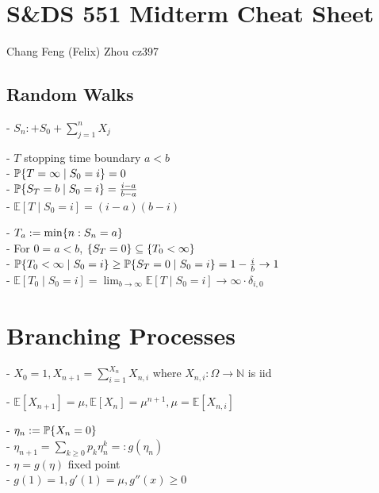 \documentclass[10pt]{article}
\DeclarePairedDelimiter{\set}{\lbrace}{\rbrace}
\newcommand{\E}{\mathbb{E}}
\newcommand{\N}{\mathbb{N}}
\renewcommand{\P}{\mathbb{P}}
\newcommand{\sset}{\subseteq}
\begin{document}
\iffalse
\begin{center}
    {\Large\textbf{Yale University}}\\
    \vspace{3mm}
    {\Large\textbf{S\&DS 551, Spring 2023}}\\
    \vspace{2mm}
    {\Large\textbf{Homework 3}}\\
    \vspace{3mm}
    \textbf{Chang Feng (Felix) Zhou cz397}
\end{center}
\fi

\begin{multicols}{3}
\section*{S\&DS 551 Midterm Cheat Sheet}
Chang Feng (Felix) Zhou
cz397

\subsection*{Random Walks}
- $S_n :+ S_0 + \sum_{j=1}^n X_j$

- $T$ stopping time boundary $a < b$ \\
- $\P\set{T=\infty\mid S_0=i} = 0$ \\
- $\P\set{S_T = b\mid S_0=i} = \frac{i-a}{b-a}$ \\
- $\E\left[ T\mid S_0=i \right] = (i-a)(b-i)$

- $T_a := \min\set{n: S_n=a}$ \\
- For $0=a<b$,
$\set{S_T=0}\sset \set{T_0<\infty}$ \\
- $\P\set{T_0<\infty\mid S_0=i}\geq \P\set{S_T=0\mid S_0=i} = 1-\frac{i}b\to 1$ \\
- $\E\left[ T_0\mid S_0=i \right] = \lim_{b\to \infty} \E\left[ T\mid S_0=i \right] \to \infty\cdot \delta_{i, 0}$


\section*{Branching Processes}
- $X_0 = 1, X_{n+1} = \sum_{i=1}^{X_n} X_{n, i}$
where $X_{n, i}: \Omega\to \N$ is iid

- $\E[X_{n+1}] = \mu, \E[X_n] = \mu^{n+1}, \mu = \E[X_{n, i}]$

- $\eta_n := \P\set{X_n=0}$ \\
- $\eta_{n+1} = \sum_{k\geq 0} p_k \eta_n^k =: g(\eta_n)$ \\
- $\eta = g(\eta)$ fixed point \\
- $g(1) = 1, g'(1) = \mu, g''(x)\geq 0$


\end{multicols}
\end{document}
